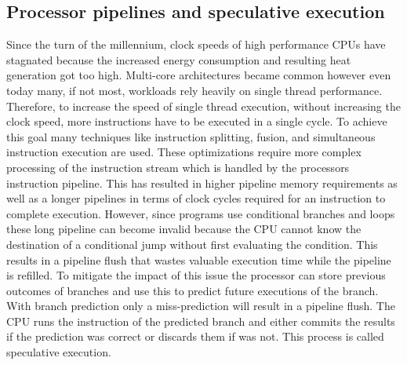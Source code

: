 \documentclass[conference,compsoc,final,a4paper]{IEEEtran}
\begin{document}
\subsection{Processor pipelines and speculative execution}
Since the turn of the millennium, clock speeds of high performance CPUs have stagnated because the increased energy consumption and resulting heat generation got
too high. \cite{fog2012microarchitecture} Multi-core architectures became common however even today many, if not most,
workloads rely heavily on single thread performance. Therefore, to increase the speed of single thread execution, without increasing the clock speed,
more instructions have to be executed in a single cycle. To achieve this goal many techniques like instruction splitting, fusion,
and simultaneous instruction execution are used. \cite{fog2012microarchitecture} These optimizations require more complex processing of the instruction stream which
is handled by the processors instruction pipeline. This has resulted in higher pipeline memory requirements as well as a longer pipelines in terms of clock cycles
required for an instruction to complete execution. However, since programs use conditional branches and loops these long pipeline can become invalid because the CPU
cannot know the destination of a conditional jump without first evaluating the condition. This results in a pipeline flush that wastes valuable execution time while
the pipeline is refilled. To mitigate the impact of this issue the processor can store previous outcomes of branches and use this to predict future executions of the
branch. With branch prediction only a miss-prediction will result in a pipeline flush. The CPU runs the instruction of the predicted branch and either commits
the results if the prediction was correct or discards them if was not.
This process is called speculative execution. \cite{kocher2018spectre}
\end{document}

